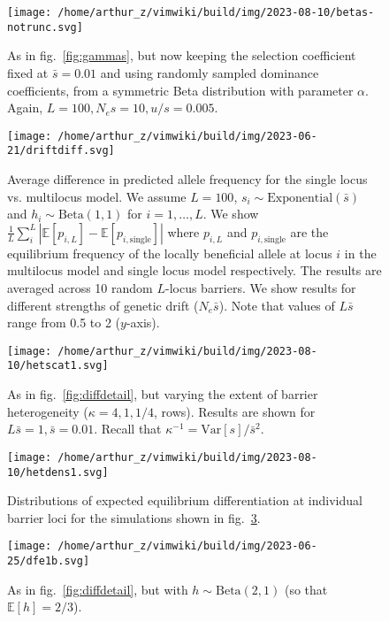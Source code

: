 \documentclass[
  11pt,
]{article}
\begin{document}
\begin{figure}
\hypertarget{fig:betas}{%
\centering
\texttt{[image: /home/arthur\_z/vimwiki/build/img/2023-08-10/betas-notrunc.svg]}
\caption{As in fig.~\ref{fig:gammas}, but now keeping the selection
coefficient fixed at \(\bar{s} = 0.01\) and using randomly sampled
dominance coefficients, from a symmetric Beta distribution with
parameter \(\alpha\). Again,
\(L=100, N_es = 10, u/s=0.005\).}\label{fig:betas}
}
\end{figure}

\begin{figure}
\hypertarget{fig:randdiff}{%
\centering
\texttt{[image: /home/arthur\_z/vimwiki/build/img/2023-06-21/driftdiff.svg]}
\caption{Average difference in predicted allele frequency for the single
locus vs. multilocus model. We assume \(L=100\),
\(s_i \sim \mathrm{Exponential}(\bar{s})\) and
\(h_i \sim \mathrm{Beta}(1,1)\) for \(i=1,\dots,L\). We show
\(\frac{1}{L}\sum_{i}^L |\mathbb{E}[p_{i,L}] - \mathbb{E}[p_{i,\text{single}}]|\)
where \(p_{i,L}\) and \(p_{i,\text{single}}\) are the equilibrium
frequency of the locally beneficial allele at locus \(i\) in the
multilocus model and single locus model respectively. The results are
averaged across 10 random \(L\)-locus barriers. We show results for
different strengths of genetic drift (\(N_e\bar{s}\)). Note that values
of \(L\bar{s}\) range from 0.5 to 2 (\(y\)-axis).}\label{fig:randdiff}
}
\end{figure}

\begin{figure}
\hypertarget{fig:hetscat}{%
\centering
\texttt{[image: /home/arthur\_z/vimwiki/build/img/2023-08-10/hetscat1.svg]}
\caption{As in fig.~\ref{fig:diffdetail}, but varying the extent of
barrier heterogeneity (\(\kappa = 4,1,1/4\), rows). Results are shown
for \(L\bar{s} = 1, \bar{s}=0.01\). Recall that
\(\kappa^{-1} = \mathrm{Var}[s]/\bar{s}^2\).}\label{fig:hetscat}
}
\end{figure}

\begin{figure}
\hypertarget{fig:hetdens}{%
\centering
\texttt{[image: /home/arthur\_z/vimwiki/build/img/2023-08-10/hetdens1.svg]}
\caption{Distributions of expected equilibrium differentiation at
individual barrier loci for the simulations shown in
fig.~\ref{fig:hetscat}.}\label{fig:hetdens}
}
\end{figure}

\begin{figure}
\hypertarget{fig:dfe1}{%
\centering
\texttt{[image: /home/arthur\_z/vimwiki/build/img/2023-06-25/dfe1b.svg]}
\caption{As in fig.~\ref{fig:diffdetail}, but with
\(h \sim \mathrm{Beta}(2,1)\) (so that
\(\mathbb{E}[h] = 2/3\)).}\label{fig:dfe1}
}
\end{figure}
\end{document}
